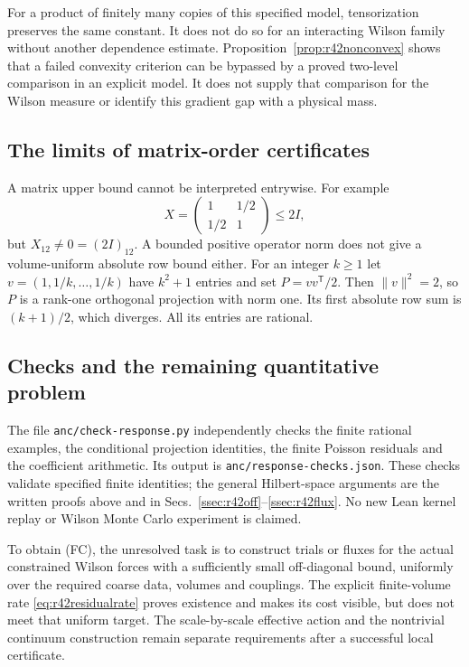 For a product of finitely many copies of this specified model,
tensorization preserves the same constant. It does not do so for an
interacting Wilson family without another dependence estimate.
Proposition~\ref{prop:r42nonconvex} shows that a failed convexity
criterion can be bypassed by a proved two-level comparison in an
explicit model. It does not supply that comparison for the Wilson
measure or identify this gradient gap with a physical mass.

\subsection{The limits of matrix-order certificates}
A matrix upper bound cannot be interpreted entrywise. For example
\[
 X=\begin{pmatrix}1&1/2\\1/2&1\end{pmatrix}\le2I,
\]
but $X_{12}\ne0=(2I)_{12}$. A bounded positive operator norm does not
give a volume-uniform absolute row bound either. For an integer
$k\ge1$ let $v=(1,1/k,\ldots,1/k)$ have $k^2+1$ entries and set
$P=vv^{\mathsf T}/2$. Then $\|v\|^2=2$, so $P$ is a rank-one
orthogonal projection with norm one. Its first absolute row sum is
$(k+1)/2$, which diverges. All its entries are rational.

\subsection{Checks and the remaining quantitative problem}
The file \texttt{anc/check-response.py} independently checks the
finite rational examples, the conditional projection identities,
the finite Poisson residuals and the coefficient arithmetic. Its
output is \texttt{anc/response-checks.json}. These checks validate
specified finite identities; the general Hilbert-space arguments are
the written proofs above and in Secs.~\ref{ssec:r42off}--\ref{ssec:r42flux}.
No new Lean kernel replay or Wilson Monte Carlo experiment is claimed.

To obtain (FC), the unresolved task is to construct trials or fluxes
for the actual constrained Wilson forces with a sufficiently small
off-diagonal bound, uniformly over the required coarse data, volumes
and couplings. The explicit finite-volume rate
\eqref{eq:r42residualrate} proves existence and makes its cost visible,
but does not meet that uniform target. The scale-by-scale effective
action and the nontrivial continuum construction remain separate
requirements after a successful local certificate.
